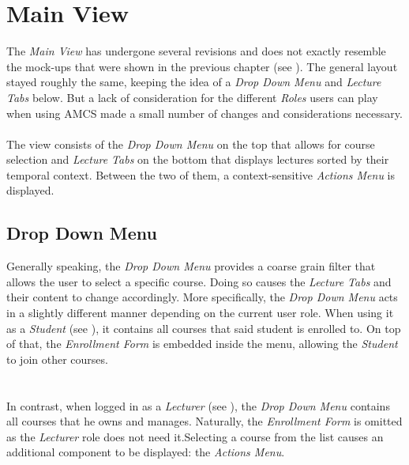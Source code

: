 \section{Main View}

The \emph{Main View} has undergone several revisions and does not exactly resemble the mock-ups that were shown in the previous chapter (see ). The general layout stayed roughly the same, keeping the idea of a \emph{Drop Down Menu} and \emph{Lecture Tabs} below. But a lack of consideration for the different \emph{Roles} users can play when using AMCS made a small number of changes and considerations necessary.
\\
\\
The view consists of the \emph{Drop Down Menu} on the top that allows for course selection and \emph{Lecture Tabs} on the bottom that displays lectures sorted by their temporal context. Between the two of them, a context-sensitive \emph{Actions Menu} is displayed.
\subsection{Drop Down Menu}
Generally speaking, the \emph{Drop Down Menu} provides a coarse grain filter that allows the user to select a specific course. Doing so causes the \emph{Lecture Tabs} and their content to change accordingly.
More specifically, the \emph{Drop Down Menu} acts in a slightly different manner depending on the current user role. When using it as a \emph{Student} (see ), it contains all courses that said student is enrolled to. On top of that, the \emph{Enrollment Form} is embedded inside the menu, allowing the \emph{Student} to join other courses.
\\
\\
\\
In contrast, when logged in as a \emph{Lecturer} (see ), the \emph{Drop Down Menu} contains all courses that he owns and manages. Naturally, the \emph{Enrollment Form} is omitted as the \emph{Lecturer} role does not need it.Selecting a course from the list causes an additional component to be displayed: the \emph{Actions Menu}.
